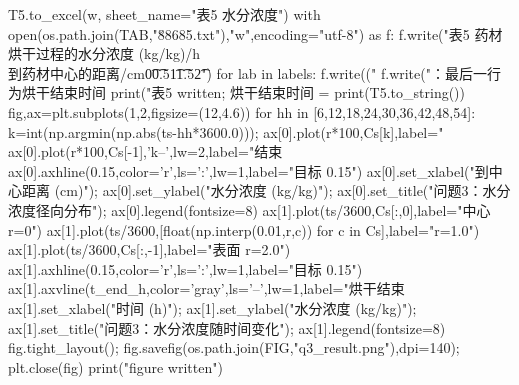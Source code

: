 \begin{codelisting}
    T5.to_excel(w, sheet_name="表5 水分浓度")
with open(os.path.join(TAB,"\u88685.txt"),"w",encoding="utf-8") as f:
    f.write("表5 药材烘干过程的水分浓度 (kg/kg)/h\\到药材中心的距离/cm\t0\t0.5\t1\t1.5\t2\n")
    for lab in labels:
        f.write(("%
    f.write("：最后一行为烘干结束时间 %
print("表5 written; 烘干结束时间 = %
print(T5.to_string())
fig,ax=plt.subplots(1,2,figsize=(12,4.6))
for hh in [6,12,18,24,30,36,42,48,54]:
    k=int(np.argmin(np.abs(ts-hh*3600.0))); ax[0].plot(r*100,Cs[k],label="%
ax[0].plot(r*100,Cs[-1],'k--',lw=2,label="结束 %
ax[0].axhline(0.15,color='r',ls=':',lw=1,label="目标 0.15")
ax[0].set_xlabel("到中心距离 (cm)"); ax[0].set_ylabel("水分浓度 (kg/kg)"); ax[0].set_title("问题3：水分浓度径向分布"); ax[0].legend(fontsize=8)
ax[1].plot(ts/3600,Cs[:,0],label="中心 r=0")
ax[1].plot(ts/3600,[float(np.interp(0.01,r,c)) for c in Cs],label="r=1.0")
ax[1].plot(ts/3600,Cs[:,-1],label="表面 r=2.0")
ax[1].axhline(0.15,color='r',ls=':',lw=1,label="目标 0.15")
ax[1].axvline(t_end_h,color='gray',ls='--',lw=1,label="烘干结束 %
ax[1].set_xlabel("时间 (h)"); ax[1].set_ylabel("水分浓度 (kg/kg)"); ax[1].set_title("问题3：水分浓度随时间变化"); ax[1].legend(fontsize=8)
fig.tight_layout(); fig.savefig(os.path.join(FIG,"q3_result.png"),dpi=140); plt.close(fig)
print("figure written")
\end{codelisting}

